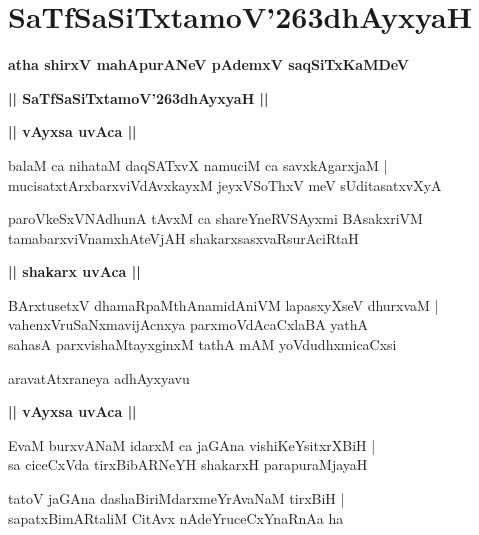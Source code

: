 \documentclass[twoside,12pt,openright]{book}
\def\S{\char'263}
\newcounter{shloka}[chapter]
\def\uvaca#1{\centerline{{\large\textbf{#1}}}}
\begin{document}
\chapter{SaTfSaSiTxtamoV\S dhAyxyaH}

\begin{center}
{\LARGE\bfseries atha shirxV mahApurANeV pAdemxV saqSiTxKaMDeV}
\end{center}

\begin{center}
{\LARGE\bfseries || SaTfSaSiTxtamoV\S dhAyxyaH || }
\end{center}

\uvaca{|| vAyxsa uvAca ||}

\begin{shloka}%
balaM ca nihataM daqSATxvX namuciM ca savxkAgarxjaM |\\
mucisatxtArxbarxviVdAvxkayxM jeyxVSoThxV meV sUditasatxvXyA 
\end{shloka}

\begin{shloka}%
paroVkeSxVNAdhunA tAvxM ca shareYneRVSAyxmi BAsakxriVM \\
tamabarxviVnamxhAteVjAH shakarxsasxvaRsurAciRtaH 
\end{shloka}

\uvaca{|| shakarx uvAca ||}

\begin{shloka}%
BArxtusetxV dhamaRpaMthAnamidAniVM lapasxyXseV dhurxvaM |\\
vahenxVruSaNxmavijAcnxya parxmoVdAcaCxlaBA yathA \\
sahasA parxvishaMtayxginxM tathA mAM yoVdudhxmicaCxsi 
\end{shloka}

\begin{center}
aravatAtxraneya adhAyxyavu
\end{center}

\uvaca{||  vAyxsa uvAca ||}

\begin{shloka}%
EvaM burxvANaM idarxM ca jaGAna vishiKeYsitxrXBiH |\\
sa ciceCxVda tirxBibARNeYH shakarxH parapuraMjayaH 
\end{shloka}

\begin{shloka}%
tatoV jaGAna dashaBiriMdarxmeYrAvaNaM tirxBiH |\\
sapatxBimARtaliM CitAvx nAdeYruceCxYnaRnAa ha 
\end{shloka}
\end{document}
